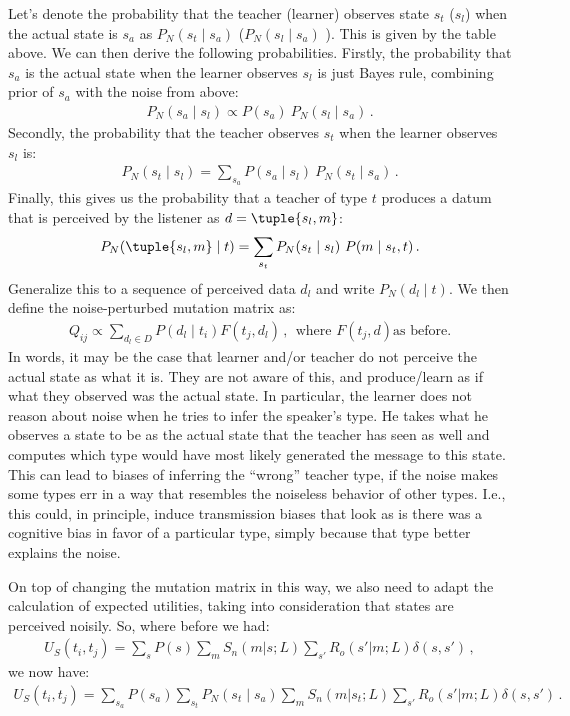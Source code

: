 \documentclass[fleqn,reqno,10pt]{article}
\begin{document}
Let's denote the probability that the teacher (learner) observes state $s_t$ ($s_l$) when the
actual state is $s_a$ as $P_N(s_t \mid s_a)$ ($P_N(s_l \mid s_a)$ ). This is given by the table
above. We can then derive the following probabilities. Firstly, the probability that $s_a$ is
the actual state when the learner observes $s_l$ is just Bayes rule, combining prior of $s_a$
with the noise from above:
\begin{align*}
  P_N(s_a \mid s_l) \propto P(s_a) \ P_N(s_l \mid s_a)\,.
\end{align*}
Secondly, the probability that the teacher observes $s_t$ when the learner observes $s_l$ is:
\begin{align*}
  P_N(s_t \mid s_l) = \sum_{s_a} P(s_a \mid s_l) \ P_N(s_t \mid s_a)\,.
\end{align*}
Finally, this gives us the probability that a teacher of type $t$ produces a datum that is
perceived by the listener as $d = \tuple{s_l, m}$:
\begin{align*}
  P_N(\tuple{s_l, m} \mid t) = \sum_{s_t} P_N(s_t \mid s_l) \ P(m \mid s_t, t)\,.
\end{align*}
Generalize this to a sequence of perceived data $d_l$ and write $P_N(d_l \mid t)$. We then
define the noise-perturbed mutation matrix as:
\begin{align*}
  Q_{ij}  \propto \sum_{d_l \in D} P(d_l \mid t_i) F(t_j,d_l) \,, \ \  \text{where $F(t_j,d)$
    as before.}
\end{align*}
In words, it may be the case that learner and/or teacher do not perceive the actual state as
what it is. They are not aware of this, and produce/learn as if what they observed was the
actual state. In particular, the learner does not reason about noise when he tries to infer the
speaker's type. He takes what he observes a state to be as the actual state that the teacher
has seen as well and computes which type would have most likely generated the message to this
state. This can lead to biases of inferring the ``wrong'' teacher type, if the noise makes some
types err in a way that resembles the noiseless behavior of other types. I.e., this could, in
principle, induce transmission biases that look as is there was a cognitive bias in favor of a
particular type, simply because that type better explains the noise.

On top of changing the mutation matrix in this way, we also need to adapt the calculation of
expected utilities, taking into consideration that states are perceived noisily. So, where
before we had:
\begin{align*}
  U_S(t_i,t_j) = \sum_s P(s)\sum_m S_n(m|s;L) \sum_{s'} R_o(s'|m;L) \delta(s,s')\,,
\end{align*}
we now have:
\begin{align*}
  U_S(t_i,t_j) = \sum_{s_a}  P(s_a) \sum_{s_t} P_N(s_t \mid s_a) \sum_m S_n(m|s_t;L) \sum_{s'} R_o(s'|m;L) \delta(s,s')\,.
\end{align*}
\end{document}
